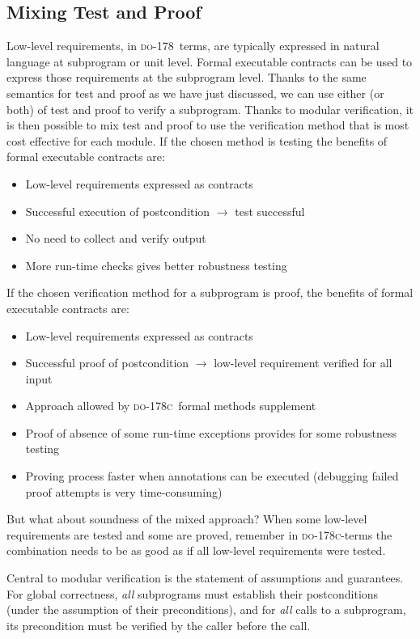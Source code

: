 \documentclass[sttt,final]{svjour}
\newcommand{\DO}{\textsc{do-178}}
\newcommand{\DOC}{\textsc{do-178c}}
\begin{document}
\subsection{Mixing Test and Proof}

Low-level requirements, in \DO\ terms, are typically expressed in
natural language at subprogram or unit level. Formal executable
contracts can be used to express those requirements at the
subprogram level. Thanks to the same semantics for test and proof as
we have just discussed, we can use either (or both) of test and proof
to verify a subprogram. Thanks to modular verification, it is then
possible to mix test and proof to use the verification method that is
most cost effective for each module. If the chosen method is testing
the benefits of formal executable contracts are:
%
\begin{itemize}
\item Low-level requirements expressed as contracts
\item Successful execution of postcondition $\rightarrow$ test successful
\item No need to collect and verify output
\item More run-time checks gives better robustness testing
\end{itemize}
If the chosen verification method for a subprogram is proof, the
benefits of formal executable contracts are:
\begin{itemize}
\item Low-level requirements expressed as contracts
\item Successful proof of postcondition $\rightarrow$ low-level
  requirement verified for all input
\item Approach allowed by \DOC\ formal methods supplement
\item Proof of absence of some run-time exceptions provides for some
  robustness testing
\item Proving process faster when annotations can be executed (debugging failed proof attempts is very time-consuming)
\end{itemize}
%
But what about soundness of the mixed approach? When some low-level
requirements are tested and some are proved, remember in
\DOC-terms the combination needs to be as good as if all low-level
requirements were tested.

Central to modular verification is the statement of assumptions and
guarantees. For global correctness, \emph{all} subprograms must
establish their postconditions (under the assumption of their
preconditions), and for \emph{all} calls to a subprogram, its
precondition must be verified by the caller before the call.
\end{document}
